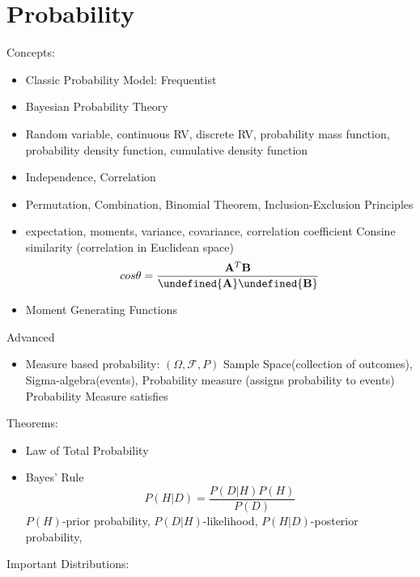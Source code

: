 \documentclass[11pt, openany]{book}              %
\let\norm\undefined %
\DeclarePairedDelimiter\norm{\lVert}{\rVert}
\begin{document}
\section{Probability}

Concepts:

\begin{itemize}
    \item Classic Probability Model: Frequentist 
    \item Bayesian Probability Theory 
    \item Random variable, continuous RV, discrete RV, probability mass function, probability density function, cumulative density function
    \item Independence, Correlation
    \item Permutation, Combination, Binomial Theorem, Inclusion-Exclusion Principles
    \item expectation, moments, variance, covariance, correlation coefficient
    	\subitem Consine similarity (correlation in Euclidean space)
    	  $$cos\theta = \frac{\mathbf{A}^T\mathbf{B}}{\norm{\mathbf{A}}\norm{\mathbf{B}}}	$$
    \item Moment Generating Functions 
\end{itemize}

Advanced

\begin{itemize}
	\item Measure based probability: $(\Omega, \mathcal{F},P)$ Sample Space(collection of outcomes), Sigma-algebra(events), Probability measure (assigns probability to events)
		\subitem Probability Measure satisfies
		
\end{itemize}

Theorems:

\begin{itemize}
    \item Law of Total Probability
    \item Bayes' Rule $$P(H|D) = \frac{P(D|H) P(H)}{P(D)}$$ $P(H)$-prior probability, $P(D|H)$-likelihood, $P(H|D)$-posterior probability,
\end{itemize}

Important Distributions: 
\end{document}
